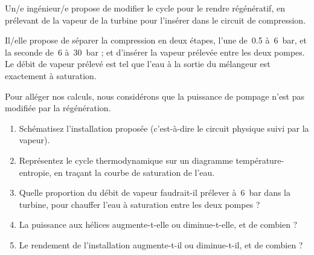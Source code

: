 	Un/e ingénieur/e propose de modifier le cycle pour le rendre régénératif, en prélevant de la vapeur de la turbine pour l’insérer dans le circuit de compression.
	
	Il/elle propose de séparer la compression en deux étapes, l’une de~\num{0,5} à~\SI{6}{\bar}, et la seconde de~\num{6} à~\SI{30}{\bar} ; et d’insérer la vapeur prélevée entre les deux pompes. Le débit de vapeur prélevé est tel que l’eau à la sortie du mélangeur est exactement à saturation.
	
	Pour alléger nos calculs, nous considérons que la puissance de pompage n’est pas modifiée par la régénération.
	
	\begin{enumerate}	
		\item Schématisez l’installation proposée (c’est-à-dire le circuit physique suivi par la vapeur).
		\item Représentez le cycle thermodynamique sur un diagramme température-entropie, en traçant la courbe de saturation de l’eau.
		\item Quelle proportion du débit de vapeur faudrait-il prélever à~\SI{6}{\bar} dans la turbine, pour chauffer l’eau à saturation entre les deux pompes ?
		\item La puissance aux hélices augmente-t-elle ou diminue-t-elle, et de combien ?
		\item Le rendement de l’installation augmente-t-il ou diminue-t-il, et de combien ?
	\end{enumerate}

\exercisesolutionpage
\titreresultats
	\linktosolutionsblurb
	
